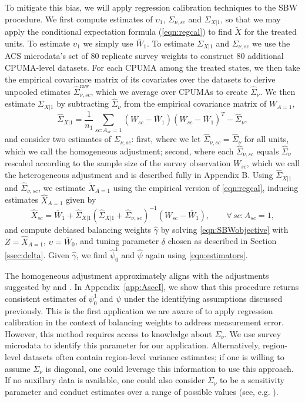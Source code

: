 \documentclass[aoas]{imsart}
\theoremstyle{plain}
\theoremstyle{remark}
\begin{document}
To mitigate this bias, we will apply regression calibration techniques to the SBW procedure. We first compute estimates of $\upsilon_1$, $\Sigma_{\nu, sc}$ and $\Sigma_{X|1}$, so that we may apply the conditional expectation formula (\ref{eqn:regcal}) to find $\tilde{X}$ for the treated units. To estimate $\upsilon_1$ we simply use $\bar{W}_1$. To estimate $\Sigma_{X|1}$ and $\Sigma_{\nu,sc}$ we use the ACS microdata's set of 80 replicate survey weights to construct 80 additional CPUMA-level datasets. For each CPUMA among the treated states, we then take the empirical covariance matrix of its covariates over the datasets to derive unpooled etimates $\hat{\Sigma}_{\nu,sc}^{\text{raw}}$, which we average over CPUMAs to create $\hat{\Sigma}_{\nu}$. We then estimate $\Sigma_{X|1}$ by subtracting $\hat{\Sigma}_{\nu}$ from the empirical covariance matrix of $W_{A=1}$,
\[ \hat{\Sigma}_{X|1} = \frac{1}{n_1} \sum_{sc:A_{sc}=1} (W_{sc} - \bar{W}_1)(W_{sc} - \bar{W}_1)^T - \hat{\Sigma}_{\nu},\]
and consider two estimates of $\Sigma_{\nu, sc}$: first, where we let $\hat{\Sigma}_{\nu,sc} = \hat{\Sigma}_{\nu}$ for all units, which we call the homogeneous adjustment; second, where each $\hat{\Sigma}_{\nu, sc}$ equals $\hat{\Sigma}_{\nu}$ rescaled according to the sample size of the survey observation $W_{sc}$, which we call the heterogeneous adjustment and is described fully in Appendix B. Using $\hat{\Sigma}_{X|1}$ and $\hat{\Sigma}_{\nu, sc}$, we estimate $\tilde{X}_{A=1}$ using the empirical version of \eqref{eqn:regcal}, inducing estimates $\hat{X}_{A=1}$ given by
\begin{equation}\label{eqn:hatX}
\hat{X}_{sc} = \bar{W}_1 + \hat{\Sigma}_{X|1} (\hat{\Sigma}_{X|1} + \hat{\Sigma}_{\nu,sc})^{-1}  (W_{sc} - \bar{W}_1), \qquad \forall\, sc: A_{sc}=1,
\end{equation}
and compute debiased balancing weights $\hat{\gamma}$ by solving \eqref{eqn:SBWobjective} with $Z = \hat{X}_{A=1}$, $\upsilon = \bar{W}_0$, and tuning parameter $\delta$ chosen as described in Section \ref{ssec:delta}. Given $\hat{\gamma}$, we find $\hat{\psi}_0^1$ and $\hat{\psi}$ again using \eqref{eqn:estimators}. 

The homogeneous adjustment approximately aligns with the adjustments suggested by \cite{carroll2006measurement} and \cite{gleser1992importance}. In Appendix~\ref{app:AsecI}, we show that this procedure returns consistent estimates of $\psi_0^1$ and $\psi$ under the identifying assumptions discussed previously. This is the first application we are aware of to apply regression calibration in the context of balancing weights to address measurement error. However, this method requires access to knowledge about $\Sigma_{\nu}$. We use survey microdata to identify this parameter for our application. Alternatively, region-level datasets often contain region-level variance estimates; if one is willing to assume $\Sigma_{\nu}$ is diagonal, one could leverage this information to use this approach. If no auxillary data is available, one could also consider $\Sigma_{\nu}$ to be a sensitivity parameter and conduct estimates over a range of possible values (see, e.g. \cite{}). 
\end{document}
